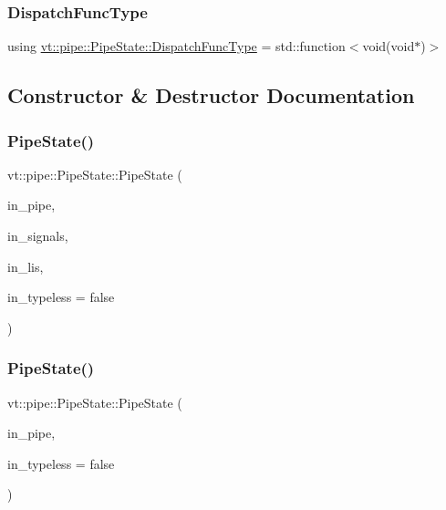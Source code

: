\subsubsection{\texorpdfstring{Dispatch\+Func\+Type}{DispatchFuncType}}
{\footnotesize\ttfamily using \hyperlink{structvt_1_1pipe_1_1_pipe_state_ad81b637847d9c3185420c58c9272ed7d}{vt\+::pipe\+::\+Pipe\+State\+::\+Dispatch\+Func\+Type} =  std\+::function$<$void(void$\ast$)$>$}



\subsection{Constructor \& Destructor Documentation}
\mbox{\label{structvt_1_1pipe_1_1_pipe_state_abbddca53ca44e4417c347235968c7ad9}} 
\subsubsection{\texorpdfstring{Pipe\+State()}{PipeState()}\hspace{0.1cm}{\footnotesize\ttfamily [1/2]}}
{\footnotesize\ttfamily vt\+::pipe\+::\+Pipe\+State\+::\+Pipe\+State (\begin{DoxyParamCaption}\item[{\hyperlink{namespacevt_ac9852acda74d1896f48f406cd72c7bd3}{Pipe\+Type} const \&}]{in\+\_\+pipe,  }\item[{\hyperlink{namespacevt_a9b39ce9494bb04674d0d5b895a5aa50f}{Ref\+Type} const \&}]{in\+\_\+signals,  }\item[{\hyperlink{namespacevt_a9b39ce9494bb04674d0d5b895a5aa50f}{Ref\+Type} const \&}]{in\+\_\+lis,  }\item[{bool const \&}]{in\+\_\+typeless = {\ttfamily false} }\end{DoxyParamCaption})}

\mbox{\label{structvt_1_1pipe_1_1_pipe_state_a2f6a2a7f657b0938d0214fc16b65969c}} 
\subsubsection{\texorpdfstring{Pipe\+State()}{PipeState()}\hspace{0.1cm}{\footnotesize\ttfamily [2/2]}}
{\footnotesize\ttfamily vt\+::pipe\+::\+Pipe\+State\+::\+Pipe\+State (\begin{DoxyParamCaption}\item[{\hyperlink{namespacevt_ac9852acda74d1896f48f406cd72c7bd3}{Pipe\+Type} const \&}]{in\+\_\+pipe,  }\item[{bool const \&}]{in\+\_\+typeless = {\ttfamily false} }\end{DoxyParamCaption})}



